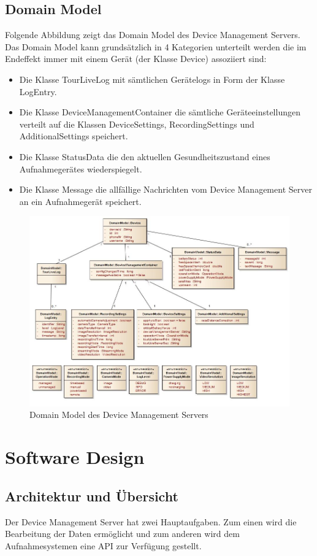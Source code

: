 \subsection{Domain Model}
Folgende Abbildung zeigt das Domain Model des Device Management Servers. Das Domain Model kann grundsätzlich in 4 Kategorien unterteilt werden die im Endeffekt immer mit einem Gerät (der Klasse Device) assoziiert sind:


\begin{itemize}
\item Die Klasse TourLiveLog mit sämtlichen Gerätelogs in Form der Klasse LogEntry. 
\item Die Klasse DeviceManagementContainer die sämtliche Geräteeinstellungen verteilt auf die Klassen DeviceSettings, RecordingSettings und AdditionalSettings speichert.
\item Die Klasse StatusData die den aktuellen Gesundheitszustand eines Aufnahmegerätes wiederspiegelt.
\item Die Klasse Message die allfällige Nachrichten vom Device Management Server an ein Aufnahmegerät speichert.

\end{itemize}

\begin{figure}[H]
	\centering
	\includegraphics[width=120mm]{images/devmgmtsrv/domainmodel.jpg}
	\caption{Domain Model des Device Management Servers}
\end{figure}


\section{Software Design}
\subsection{Architektur und Übersicht}
Der Device Management Server hat zwei Hauptaufgaben. Zum einen wird die Bearbeitung der Daten ermöglicht und zum anderen wird dem Aufnahmesystemen eine API zur Verfügung gestellt.


